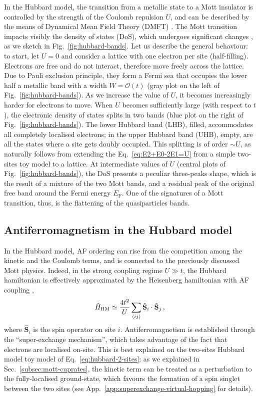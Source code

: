 In the Hubbard model, the transition from a metallic state to a Mott insulator is controlled by the strength of the Coulomb repulsion $U$, and can be described by the means of Dynamical Mean Field Theory (DMFT) \cite{georges1996dynamical}. The Mott transition impacts visibly the density of states (DoS), which undergoes significant changes \cite{kotliar2004strongly}, as we sketch in Fig.~\ref{fig:hubbard-bands}. Let us describe the general behaviour: to start, let $U=0$ and consider a lattice with one electron per site (half-filling). Electrons are free and do not interact, therefore move freely across the lattice. Due to Pauli exclusion principle, they form a Fermi sea that occupies the lower half a metallic band with a width $W = \mathcal{O}(t)$ (gray plot on the left of Fig.~\ref{fig:hubbard-bands}). As we increase the value of $U$, it becomes increasingly harder for electrons to move. When $U$ becomes sufficiently large (with respect to $t$), the electronic density of states splits in two bands (blue plot on the right of Fig.~\ref{fig:hubbard-bands}). The lower Hubbard band (LHB), filled, accommodates all completely localised electrons; in the upper Hubbard band (UHB), empty, are all the states where a site gets doubly occupied. This splitting is of order $\sim U$, as naturally follows from extending the Eq.~\eqref{eq:E2+E0-2E1=U} from a simple two-sites toy model to a lattice. At intermediate values of $U$ (central plots of Fig.~\ref{fig:hubbard-bands}), the DoS presents a peculiar three-peaks shape, which is the result of a mixture of the two Mott bands, and a residual peak of the original free band around the Fermi energy $E_\mathrm{F}$. One of the signatures of a Mott transition, thus, is the flattening of the quasiparticles bands.

\subsection{Antiferromagnetism in the Hubbard model}\label{subsec:af-cuprates}

In the Hubbard model, AF ordering can rise from the competition among the kinetic and the Coulomb terms, and is connected to the previously discussed Mott physics. Indeed, in the strong coupling regime $U \gg t$, the Hubbard hamiltonian is effectively approximated by the Heisenberg hamiltonian with AF coupling \cite{marston1989large},
\[
	\hat H_\mathrm{HM} \simeq \frac{4t^2}{U} \sum_{\ev{ij}} \hat{\mathbf{S}}_i \cdot \hat{\mathbf{S}}_j \, ,
\]
where $\hat{\mathbf{S}}_i$ is the spin operator on site $i$.  Antiferromagnetism is established through the ``super-exchange mechanism'', which takes advantage of the fact that electrons are localised on-site. This is best explained on the two-sites Hubbard model toy model of Eq.~\eqref{eq:hubbard-2-sites}: as we explained in Sec.~\ref{subsec:mott-cuprates}, the kinetic term can be treated as a perturbation to the fully-localised ground-state, which favours the formation of a spin singlet between the two sites (see App.~\ref{app:superexchange-virtual-hopping} for details).

